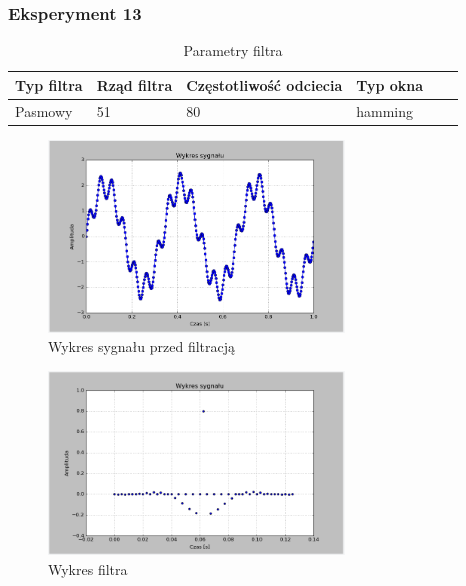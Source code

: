 \documentclass{article}
\begin{document}
{        \subsubsection{Eksperyment 13} {
            \begin{table}[h!]
            \centering
            \begin{tabular}{|l|l|l|l|l|l|}
            \hline
            Typ filtra & Rząd filtra & Częstotliwość odciecia & Typ okna  \\\hline
            Pasmowy & 51 & 80 & hamming     \\\hline
            \end{tabular}
            \caption{Parametry filtra}
            \end{table}
            \begin{figure}[h!]
                \centering
                \includegraphics[width=0.7\textwidth]{img/sig.png}
                \caption{Wykres sygnału przed filtracją}
            \end{figure}
            \begin{figure}[h!]
                \centering
                \includegraphics[width=0.7\textwidth]{img/fil25.png}
                \caption{Wykres filtra}
            \end{figure}

}}
\end{document}
